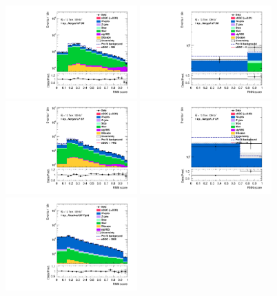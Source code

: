\begin{figure}[]
    \centering
    \includegraphics[width=0.45\textwidth]{figures/aQGC/PostFit/Region_distRNN_DSRVBSHPLMlvJ1500_BMin0_J0_incJet1_L1_T0_incFat1_Y6051_incTag1_Fat1_GlobalFit_unconditionnal_mu1log}
    \includegraphics[width=0.45\textwidth]{figures/aQGC/PostFit/Region_distRNN_DSRVBSHPHMlvJ1500_BMin0_J0_incJet1_L1_T0_incFat1_Y6051_incTag1_Fat1_GlobalFit_unconditionnal_mu1log}
    \includegraphics[width=0.45\textwidth]{figures/aQGC/PostFit/Region_distRNN_DSRVBSLPLMlvJ1500_BMin0_J0_incJet1_L1_T0_incFat1_Y6051_incTag1_Fat1_GlobalFit_unconditionnal_mu1log}
    \includegraphics[width=0.45\textwidth]{figures/aQGC/PostFit/Region_distRNN_DSRVBSLPHMlvJ1500_BMin0_J0_incJet1_L1_T0_incFat1_Y6051_incTag1_Fat1_GlobalFit_unconditionnal_mu1log}
    \includegraphics[width=0.45\textwidth]{figures/aQGC/PostFit/Region_distRNN_DSRVBSTightLMlvjj1500_BMin0_T0_Y6051_incTag1_J2_L1_incJet1_GlobalFit_unconditionnal_mu1log}

\end{figure}
